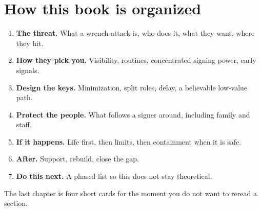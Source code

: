 \section{How this book is organized}

\begin{enumerate}
  \item \textbf{The threat.} What a wrench attack is,
  who does it, what they want, where they hit.
  \item \textbf{How they pick you.} Visibility, routines,
  concentrated signing power, early signals.
  \item \textbf{Design the keys.} Minimization, split
  roles, delay, a believable low-value path.
  \item \textbf{Protect the people.} What follows a
  signer around, including family and staff.
  \item \textbf{If it happens.} Life first, then limits,
  then containment when it is safe.
  \item \textbf{After.} Support, rebuild, close the gap.
  \item \textbf{Do this next.} A phased list so this does
  not stay theoretical.
\end{enumerate}

The last chapter is four short cards for the moment you
do not want to reread a section.
